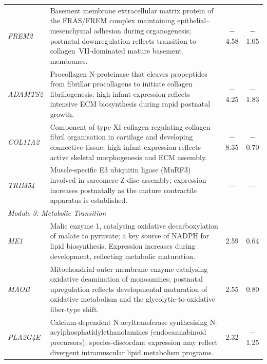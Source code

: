 \documentclass[10pt,a4paper]{article}
\begin{document}
\begin{landscape}
\begin{table}[p]
\begin{tabularx}{\linewidth}{lXcc}
    \textit{FREM2} & Basement membrane extracellular matrix protein of the FRAS/FREM complex maintaining epithelial--mesenchymal adhesion during organogenesis; postnatal downregulation reflects transition to collagen~VII-dominated mature basement membranes\cite{kiyozumi_breakdown_2006}. & $-$4.58 & $-$1.05 \\
    \textit{ADAMTS2} & Procollagen N-proteinase that cleaves propeptides from fibrillar procollagens to initiate collagen fibrillogenesis; high infant expression reflects intensive ECM biosynthesis during rapid postnatal growth\cite{colige_cdna_1997}. & $-$4.25 & $-$1.83 \\
    \textit{COL11A2} & Component of type XI collagen regulating collagen fibril organisation in cartilage and developing connective tissue; high infant expression reflects active skeletal morphogenesis and ECM assembly\cite{sun_collagen_2020}. & $-$8.35 & $-$0.70 \\
    \textit{TRIM54} & Muscle-specific E3 ubiquitin ligase (MuRF3) involved in sarcomere Z-disc assembly; expression increases postnatally as the mature contractile apparatus is established. & --- & --- \\
    \midrule
    \multicolumn{4}{l}{\textit{Module 3: Metabolic Transition}} \\
    \textit{ME1} & Malic enzyme 1, catalysing oxidative decarboxylation of malate to pyruvate; a key source of NADPH for lipid biosynthesis. Expression increases during development, reflecting metabolic maturation. & 2.59 & 0.64 \\
    \textit{MAOB} & Mitochondrial outer membrane enzyme catalysing oxidative deamination of monoamines; postnatal upregulation reflects developmental maturation of oxidative metabolism and the glycolytic-to-oxidative fiber-type shift. & 2.55 & 0.80 \\
    \textit{PLA2G4E} & Calcium-dependent N-acyltransferase synthesising N-acylphosphatidylethanolamines (endocannabinoid precursors); species-discordant expression may reflect divergent intramuscular lipid metabolism programs. & 2.32 & $-$1.25 \\
    \bottomrule
  \end{tabularx}
\end{table}
\end{landscape}

\clearpage
\end{document}
